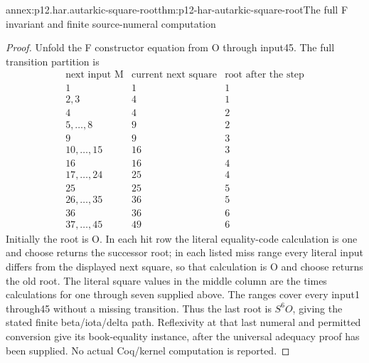 \begin{annexitem}{annex:p12.har.autarkic-square-root}{thm:p12-har-autarkic-square-root}{The full F invariant and finite source-numeral computation}
\begin{proof}
Unfold the F constructor equation from O through input45. The full
transition partition is
\[
\begin{array}{c|c|c}
 \text{next input M}&\text{current next square}&\text{root after the step}\\\hline
 1&1&1\\
 2,3&4&1\\
 4&4&2\\
 5,\ldots,8&9&2\\
 9&9&3\\
 10,\ldots,15&16&3\\
 16&16&4\\
 17,\ldots,24&25&4\\
 25&25&5\\
 26,\ldots,35&36&5\\
 36&36&6\\
 37,\ldots,45&49&6
\end{array}
\]
Initially the root is O. In each hit row the literal equality-code
calculation is one and choose returns the successor root; in each
listed miss range every literal input differs from the displayed
next square, so that calculation is O and choose returns the old root.
The literal square values in the middle column are the times
calculations for one through seven supplied above. The ranges cover
every input1 through45 without a missing transition. Thus the last
root is \(S^6O\), giving the stated finite beta/iota/delta path.
Reflexivity at that last numeral and permitted conversion give its
book-equality instance, after the universal adequacy proof has been
supplied. No actual Coq/kernel computation is reported.
\end{proof}
\end{annexitem}


